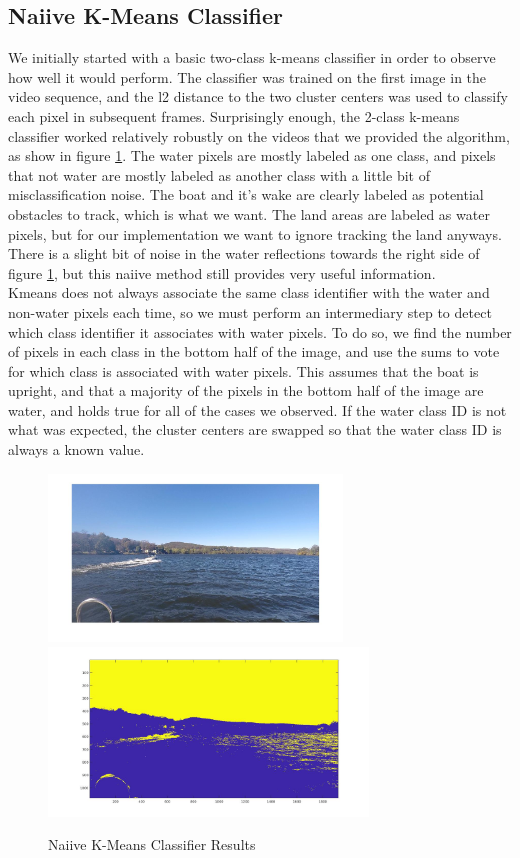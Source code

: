 \documentclass{article}
\begin{document}
\subsection{Naiive K-Means Classifier}
We initially started with a basic two-class k-means classifier in order to observe how well it would perform.  The classifier was trained on the first image in the video sequence, and the l2 distance to the two cluster centers was used to classify each pixel in subsequent frames.  Surprisingly enough, the 2-class k-means classifier worked relatively robustly on the videos that we provided the algorithm, as show in figure \ref{fig:kmeans}.  The water pixels are mostly labeled as one class, and pixels that not water are mostly labeled as another class with a little bit of misclassification noise.  The boat and it's wake are clearly labeled as potential obstacles to track, which is what we want. The land areas are labeled as water pixels, but for our implementation we want to ignore tracking the land anyways. There is a slight bit of noise in the water reflections towards the right side of figure \ref{fig:kmeans}, but this naiive method still provides very useful information. \\
\newline
Kmeans does not always associate the same class identifier with the water and non-water pixels each time, so we must perform an intermediary step to detect which class identifier it associates with water pixels.  To do so, we find the number of pixels in each class in the bottom half of the image, and use the sums to vote for which class is associated with water pixels. This assumes that the boat is upright, and that a majority of the pixels in the bottom half of the image are water, and holds true for all of the cases we observed.  If the water class ID is not what was expected, the cluster centers are swapped so that the water class ID is always a known value.

\begin{figure}
\label{fig:kmeans}
\includegraphics[width=7.8cm]{hsv_kmeans2_orig}
\includegraphics[width=8.5cm]{hsv_kmeans2_result}
\centering
\caption{Naiive K-Means Classifier Results}
\end{figure}
\end{document}
